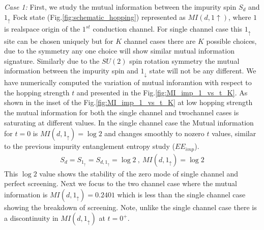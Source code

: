 \documentclass[reprint,prb,superscriptaddress]{revtex4-2}
\begin{document}
\par \textit{Case 1:} First, we study the mutual information between the impurity spin $S_d$ and $1_\uparrow$ Fock state (Fig.\ref{fig:schematic_hopping}) represented as $MI(d,1\uparrow)$, where $1$ is realspace origin of the $1^{st}$ conduction channel. For single channel case this $1_{\uparrow}$ site can be chosen uniquely but for $K$ channel cases there are $K$ possible choices, due to the symmetry any one choice will show similar mutual information signature. Similarly due to the $SU(2)$ spin rotation symmetry the mutual information between the impurity spin and $1_{\downarrow}$ state will not be any different. We have numerically computed the variation of mutual inforamtion with respect to the hopping strength $t$ and presented in the Fig.\ref{fig:MI_imp_1_vs_t_K}.  As shown in the inset of the Fig.\ref{fig:MI_imp_1_vs_t_K} at low hopping strength the mutual information for both the single channel and twochannel cases is saturating at different values. In the single channel case the Mutual information for $t=0$ is $MI(d,1_{\uparrow})=\log 2$ and changes smoothly to nozero $t$ values, similar to the previous impurity entanglement entropy study ($EE_{imp}$).
\begin{eqnarray}
S_{d}=S_{1_{\uparrow}}=S_{d,1_{\uparrow}}=\log 2~,~MI(d,1_{\uparrow})=\log 2
\end{eqnarray}
This $\log 2$ value shows the stability of the zero mode of single channel and perfect screening. Next we focus to the two channel case where the mutual information is $MI(d,1_{\uparrow})=0.2401$ which is less than the single channel case showing the breakdown of screening. Note, unlike the single channel case there is a discontinuity in $MI(d,1_{\uparrow})$ at $t=0^+$.
\end{document}
